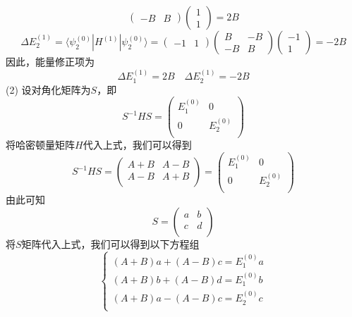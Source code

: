 \begin{solution}
$$\begin{pmatrix}
            -B & B
        \end{pmatrix}\begin{pmatrix}
            1 \\
            1
        \end{pmatrix}
        = 2B
    $$
    $$
        \Delta E^{(1)}_2
        = \langle \psi^{(0)}_2 | H^{(1)} | \psi^{(0)}_2 \rangle
        = \begin{pmatrix}
            -1 & 1
        \end{pmatrix}\begin{pmatrix}
            B  & -B \\
            -B & B
        \end{pmatrix}\begin{pmatrix}
            -1 \\ 1
        \end{pmatrix}
        = -2B
    $$
    因此，能量修正项为
    $$
        \Delta E^{(1)}_1 = 2B \quad \Delta E^{(1)}_2 = -2B
    $$
    (2) 设对角化矩阵为$S$，即
    $$
        S^{-1} H S = \begin{pmatrix}
            E_1^{(0)} & 0         \\
            0         & E_2^{(0)} \\
        \end{pmatrix}
    $$
    将哈密顿量矩阵$H$代入上式，我们可以得到
    $$
        S^{-1} H S = \begin{pmatrix}
            A+B & A-B \\
            A-B & A+B \\
        \end{pmatrix} = \begin{pmatrix}
            E_1^{(0)} & 0         \\
            0         & E_2^{(0)} \\
        \end{pmatrix}
    $$
    由此可知
    $$
        S = \begin{pmatrix}
            a & b \\
            c & d \\
        \end{pmatrix}
    $$
    将$S$矩阵代入上式，我们可以得到以下方程组
    $$
        \begin{cases}
            (A+B)a + (A-B)c = E_1^{(0)}a \\
            (A+B)b + (A-B)d = E_1^{(0)}b \\
            (A+B)a - (A-B)c = E_2^{(0)}c \\

\end{cases}$$
\end{solution}
